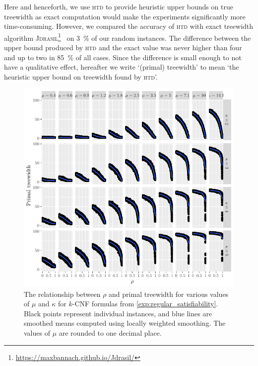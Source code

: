\documentclass[runningheads]{llncs}
\begin{document}
\begin{remark}
  Here and henceforth, we use \textsc{htd} to provide heuristic upper bounds on
  true treewidth as exact computation would make the experiments significantly
  more time-consuming. However, we compared the accuracy of \textsc{htd} with
  exact treewidth algorithm
  \textsc{Jdrasil}\footnote{\url{https://maxbannach.github.io/Jdrasil/}}~\cite{DBLP:conf/wea/BannachBE17}
  on \SI{3}{\percent} of our random instances. The difference between the upper
  bound produced by \textsc{htd} and the exact value was never higher than four
  and up to two in \SI{85}{\percent} of all cases. Since the difference is small
  enough to not have a qualitative effect, hereafter we write `(primal)
  treewidth' to mean `the heuristic upper bound on treewidth found by
  \textsc{htd}'.
\end{remark}

\begin{figure}[t]
  \centering
  \includegraphics{regular_repetitiveness.pdf}
  \caption{The relationship between $\rho$ and primal treewidth for various
    values of $\mu$ and $\kappa$ for $k$-CNF formulas from
    \cref{exp:regular_satisfiability}. Black points represent individual
    instances, and blue lines are smoothed means computed using locally weighted
    smoothing. The values of $\mu$ are rounded to one decimal
    place.}\label{fig:regular_repetitiveness}
\end{figure}
\end{document}
